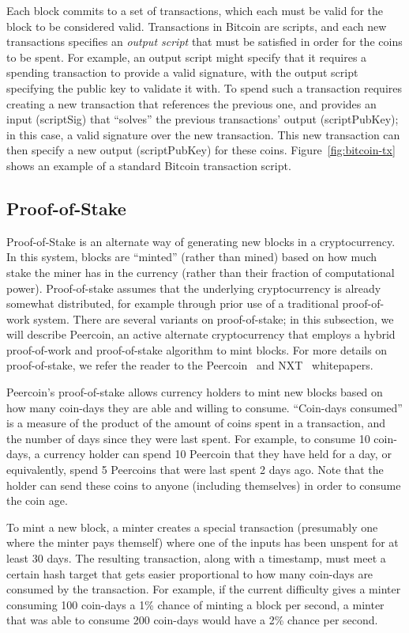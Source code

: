 Each block commits to a set of transactions, which each must be valid for the
block to be considered valid. Transactions in Bitcoin are scripts, and each new
transactions specifies an \emph{output script} that must be satisfied in order
for the coins
to be spent. For example, an output script might specify that it requires a
spending transaction to provide a valid signature, with the output script
specifying the public key to validate it with. To spend such a transaction
requires creating a new transaction that references the previous one, and
provides an input (scriptSig) that ``solves'' the previous transactions' output
(scriptPubKey); in this case, a valid signature over the new transaction. This
new transaction can then specify a new output (scriptPubKey) for these coins.
Figure~\ref{fig:bitcoin-tx} shows an example of a standard Bitcoin transaction
script.


\subsection{Proof-of-Stake}

Proof-of-Stake is an alternate way of generating new blocks in a cryptocurrency.
In this system, blocks are ``minted'' (rather than mined) based on how much
stake the miner has in the currency (rather than their fraction of computational
power). Proof-of-stake assumes that the underlying cryptocurrency is already
somewhat distributed, for example through prior use of a traditional
proof-of-work system. There are several variants on proof-of-stake; in this
subsection, we will describe Peercoin, an active alternate cryptocurrency that
employs a hybrid proof-of-work and proof-of-stake algorithm to mint blocks. For
more details on proof-of-stake, we refer the reader to the
Peercoin~\cite{peercoin} and NXT~\cite{nxt} whitepapers.

Peercoin's proof-of-stake allows currency holders to mint new blocks based on
how many coin-days they are able and willing to consume. ``Coin-days consumed''
is a measure of the product of the amount of coins spent in a transaction, and
the number of days since they were last spent. For example, to consume 10
coin-days, a currency holder can spend 10 Peercoin that they have held for a
day, or equivalently, spend 5 Peercoins that were last spent 2 days ago. Note
that the holder can send these coins to anyone (including themselves) in order
to consume the coin age.

To mint a new block, a minter creates a special transaction (presumably one
where the minter pays themself) where one of the inputs has been unspent for at
least 30 days. The resulting transaction, along with a timestamp, must meet a
certain hash target that gets easier proportional to how many coin-days are
consumed by the transaction. For example, if the current difficulty gives a
minter consuming 100 coin-days a 1\% chance of minting a block per second, a
minter that was able to consume 200 coin-days would have a 2\% chance per
second.

